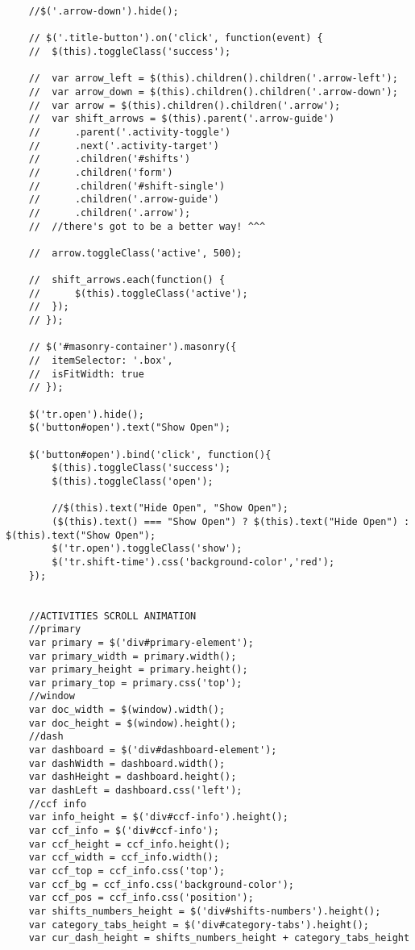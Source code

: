 \documentclass[11pt]{article}
\begin{document}
\begin{itemize}
\begin{itemize}
\begin{verbatim}
    //$('.arrow-down').hide();

    // $('.title-button').on('click', function(event) {
    //  $(this).toggleClass('success');

    //  var arrow_left = $(this).children().children('.arrow-left');
    //  var arrow_down = $(this).children().children('.arrow-down');
    //  var arrow = $(this).children().children('.arrow');
    //  var shift_arrows = $(this).parent('.arrow-guide')
    //      .parent('.activity-toggle')
    //      .next('.activity-target')
    //      .children('#shifts')
    //      .children('form')
    //      .children('#shift-single')
    //      .children('.arrow-guide')
    //      .children('.arrow');
    //  //there's got to be a better way! ^^^

    //  arrow.toggleClass('active', 500);

    //  shift_arrows.each(function() {
    //      $(this).toggleClass('active');
    //  });
    // });

    // $('#masonry-container').masonry({
    //  itemSelector: '.box',
    //  isFitWidth: true
    // });

    $('tr.open').hide();
    $('button#open').text("Show Open");

    $('button#open').bind('click', function(){
        $(this).toggleClass('success');
        $(this).toggleClass('open');

        //$(this).text("Hide Open", "Show Open");
        ($(this).text() === "Show Open") ? $(this).text("Hide Open") : $(this).text("Show Open");
        $('tr.open').toggleClass('show');
        $('tr.shift-time').css('background-color','red');
    });


    //ACTIVITIES SCROLL ANIMATION
    //primary
    var primary = $('div#primary-element');
    var primary_width = primary.width();
    var primary_height = primary.height();
    var primary_top = primary.css('top');
    //window
    var doc_width = $(window).width();
    var doc_height = $(window).height();
    //dash
    var dashboard = $('div#dashboard-element');
    var dashWidth = dashboard.width();
    var dashHeight = dashboard.height();
    var dashLeft = dashboard.css('left');
    //ccf info
    var info_height = $('div#ccf-info').height();
    var ccf_info = $('div#ccf-info');
    var ccf_height = ccf_info.height();
    var ccf_width = ccf_info.width();
    var ccf_top = ccf_info.css('top');
    var ccf_bg = ccf_info.css('background-color');
    var ccf_pos = ccf_info.css('position');
    var shifts_numbers_height = $('div#shifts-numbers').height();
    var category_tabs_height = $('div#category-tabs').height();
    var cur_dash_height = shifts_numbers_height + category_tabs_height


\end{verbatim}
\end{itemize}
\end{itemize}
\end{document}
